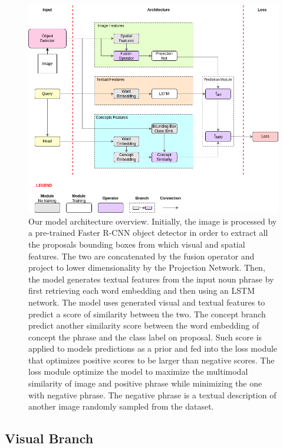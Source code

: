 \begin{figure}
  \centering
  \includegraphics[width=1.0\textwidth]{figures/model-architecture.png}
  \caption[Model architecture overview]{ Our model architecture
    overview. Initially, the image is processed by a pre-trained
    Faster R-CNN object detector in order to extract all the proposals
    bounding boxes from which visual and spatial features. The two are
    concatenated by the fusion operator and project to lower
    dimensionality by the Projection Network. Then, the model
    generates textual features from the input noun phrase by first
    retrieving each word embedding and then using an LSTM network. The
    model uses generated visual and textual features to predict a
    score of similarity between the two. The concept branch predict
    another similarity score between the word embedding of concept the
    phrase and the class label on proposal. Such score is applied to
    models predictions as a prior and fed into the loss module that
    optimizes positive scores to be larger than negative scores. The
    loss module optimize the model to maximize the multimodal
    similarity of image and positive phrase while minimizing the one
    with negative phrase. The negative phrase is a textual description
    of another image randomly sampled from the dataset.}
  \label{fig:model-architecture}
\end{figure}

\subsection{Visual Branch}
\label{subsec:visual-branch}

